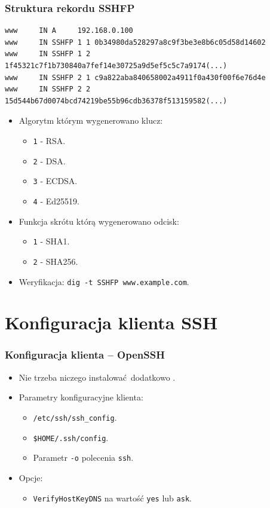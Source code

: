 \documentclass[dvipsnames,table]{beamer}
\begin{document}
\begin{frame}[fragile]
\frametitle{Struktura rekordu SSHFP}
\scriptsize
\begin{verbatim}
www		IN A	 192.168.0.100
www		IN SSHFP 1 1 0b34980da528297a8c9f3be3e8b6c05d58d14602
www		IN SSHFP 1 2 1f45321c7f1b730840a7fef14e30725a9d5ef5c5c7a9174(...)
www		IN SSHFP 2 1 c9a822aba840658002a4911f0a430f00f6e76d4e
www		IN SSHFP 2 2 15d544b67d0074bcd74219be55b96cdb36378f513159582(...)
\end{verbatim}
\normalsize
\begin{itemize}
	\item Algorytm którym wygenerowano klucz:
	\begin{itemize}
		\item {\tt 1} - RSA.
		\item {\tt 2} - DSA.
		\item {\tt 3} - ECDSA.
		\item {\tt 4} - Ed25519.
	\end{itemize}
	\item Funkcja skrótu którą wygenerowano odcisk:
	\begin{itemize}
		\item {\tt 1} - SHA1.
		\item {\tt 2} - SHA256.
	\end{itemize}
	\item Weryfikacja: {\tt dig -t SSHFP www.example.com}.
\end{itemize}
\end{frame}

\section{Konfiguracja klienta SSH}

\begin{frame}
\frametitle{Konfiguracja klienta -- OpenSSH}
\begin{itemize}
	\item Nie trzeba niczego instalować dodatkowo \Smiley.
	\item Parametry konfiguracyjne klienta:
	\begin{itemize}
		\item {\tt /etc/ssh/ssh\_config}.
		\item {\tt \$HOME/.ssh/config}.
		\item Parametr {\tt -o} polecenia {\tt ssh}. 
	\end{itemize}
	\item Opcje:
	\begin{itemize}
		\item {\tt VerifyHostKeyDNS} na wartość {\tt yes} lub {\tt ask}.
	\end{itemize}
\end{itemize}
\end{frame}
\end{document}
